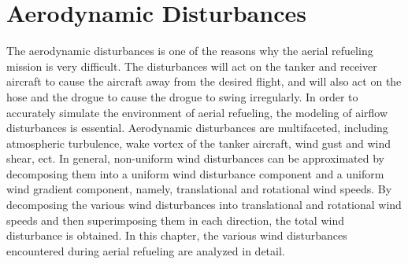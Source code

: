 
\chapter{Aerodynamic Disturbances}

The aerodynamic disturbances is one of the reasons why the aerial refueling mission is very difficult. The disturbances will act on the tanker and receiver aircraft to cause the aircraft away from the desired flight, and will also act on the hose and the drogue to cause the drogue to swing irregularly. In order to accurately simulate the environment of aerial refueling, the modeling of airflow disturbances is essential. Aerodynamic disturbances are multifaceted, including atmospheric turbulence, wake vortex of the tanker aircraft, wind gust and wind shear, ect. In general, non-uniform wind disturbances can be approximated by decomposing them into a uniform wind disturbance component and a uniform wind gradient component, namely, translational and rotational wind speeds. By decomposing the various wind disturbances into translational and rotational wind speeds and then superimposing them in each direction, the total wind disturbance is obtained. In this chapter, the various wind disturbances encountered during aerial refueling are analyzed in detail.

